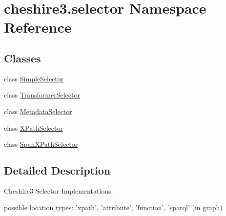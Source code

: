 \hypertarget{namespacecheshire3_1_1selector}{\section{cheshire3.\-selector Namespace Reference}
\label{namespacecheshire3_1_1selector}
}
\subsection*{Classes}
\begin{DoxyCompactItemize}
\item 
class \hyperlink{classcheshire3_1_1selector_1_1_simple_selector}{Simple\-Selector}
\item 
class \hyperlink{classcheshire3_1_1selector_1_1_transformer_selector}{Transformer\-Selector}
\item 
class \hyperlink{classcheshire3_1_1selector_1_1_metadata_selector}{Metadata\-Selector}
\item 
class \hyperlink{classcheshire3_1_1selector_1_1_x_path_selector}{X\-Path\-Selector}
\item 
class \hyperlink{classcheshire3_1_1selector_1_1_span_x_path_selector}{Span\-X\-Path\-Selector}
\end{DoxyCompactItemize}


\subsection{Detailed Description}
\begin{DoxyVerb}Cheshire3 Selector Implementations.

possible location types:  'xpath', 'attribute', 'function', 'sparql' (in graph)
\end{DoxyVerb}
 